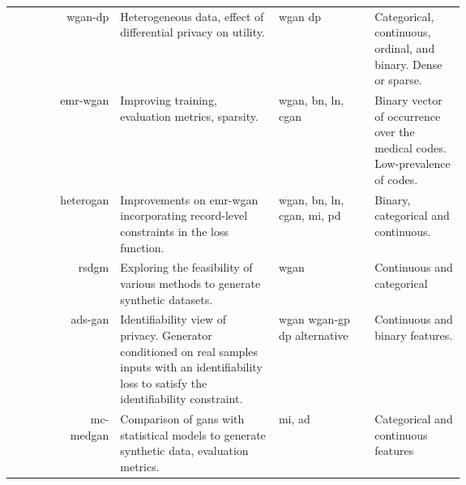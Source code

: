 \begin{landscape}
\begin{longtable}[l]{@{}p{0.10\linewidth}Rp{0.35\linewidth}Mp{0.20\linewidth}@{}}
        \citeauthor{chincheong2020generation} & \gls{wgan-dp}
        & Heterogeneous data, effect of differential privacy on utility.  & \gls{wgan} \gls{dp}
        & Categorical, continuous,  ordinal, and binary. Dense or sparse.\\
        
        \citeauthor{Zhang2020} & \gls{emr-wgan}
        & Improving training, evaluation metrics, sparsity. & \gls{wgan}, \gls{bn}, \gls{ln}, \gls{cgan}
        & Binary vector of occurrence over the medical codes. Low-prevalence of codes. \\
        
        \citeauthor{yan2020generating} & \gls{heterogan}
        & Improvements on \gls{emr-wgan} incorporating record-level constraints in the loss function.  & \gls{wgan}, \gls{bn}, \gls{ln}, \gls{cgan}, \gls{mi}, \gls{pd}
        & Binary, categorical and continuous.\\
        
        \citeauthor{ozyigit2020generation} & \gls{rsdgm}
        & Exploring the feasibility of various methods to generate synthetic datasets.  & \gls{wgan}
        & Continuous and categorical\\
        
        \citeauthor{Yoon2020-anon} & \gls{ads-gan}
        & Identifiability view of privacy. Generator conditioned on real samples inputs with an identifiability loss to satisfy the identifiability constraint.  & \gls{wgan} \gls{wgan-gp} \gls{dp} alternative
        & Continuous and binary features.\\
        
        \citeauthor{Goncalves2020} & \gls{mc-medgan}
        & Comparison of \glspl{gan} with statistical models to generate synthetic data, evaluation metrics.  & \gls{mi}, \gls{ad}
        & Categorical and continuous features\\
           
        \hline
        
    \end{longtable}
\end{landscape}